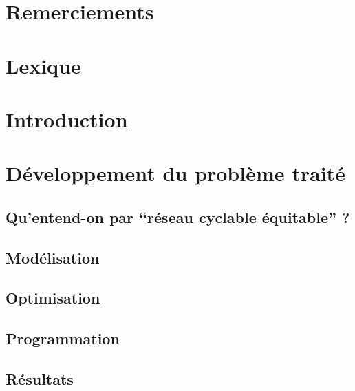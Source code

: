 \documentclass[a4paper,12pt,french]{article}
\begin{document}
\allowdisplaybreaks


\clearpage
\hfill
\clearpage

\section*{Remerciements}


\newpage
\tableofcontents
\newpage

\setlength{\parskip}{1em} %

\section{Lexique}


\section{Introduction}


\section{Développement du problème traité}
\subsection{Qu'entend-on par ``réseau cyclable équitable'' ?} \label{sect:equite}


\subsection{Modélisation} \label{sect:modelisation}


\subsection{Optimisation}


\subsection{Programmation}


\subsection{Résultats}

\end{document}
